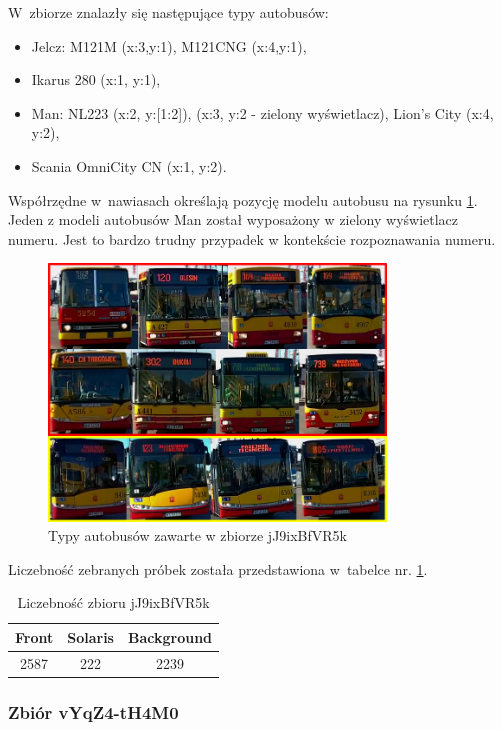 W~zbiorze znalazły się następujące typy autobusów: 
\begin{itemize}
    \item Jelcz: M121M (x:3,y:1), M121CNG (x:4,y:1),
    \item Ikarus 280 (x:1, y:1),
    \item Man: NL223 (x:2, y:[1:2]), (x:3, y:2 - zielony wyświetlacz),
        Lion's City (x:4, y:2),
    \item Scania OmniCity CN (x:1, y:2). 
\end{itemize}
Współrzędne w~nawiasach określają pozycję modelu autobusu na rysunku
\ref{fig:jJ9ixBfVR5k_types}.
Jeden z modeli autobusów Man został wyposażony w zielony wyświetlacz numeru.
Jest to bardzo trudny przypadek w kontekście rozpoznawania numeru.

\begin{figure}[!h]
    \centering
    \includegraphics[width=0.8\textwidth]{img/exp_trainig_data_jJ9}
    \caption{Typy autobusów zawarte w zbiorze jJ9ixBfVR5k}
    \label{fig:jJ9ixBfVR5k_types}
\end{figure}

Liczebność zebranych próbek została przedstawiona w~tabelce nr. 
\ref{tab:jJ9ixBfVR5k_count}.

\begin{table}[!h]
    \centering
    \begin{tabular}{c|c|c}
        Front   & Solaris   & Background \\ \hline
        2587    & 222       & 2239
    \end{tabular}
    \caption{Liczebność zbioru jJ9ixBfVR5k}
    \label{tab:jJ9ixBfVR5k_count}
\end{table}

\subsubsection{Zbiór vYqZ4-tH4M0}

